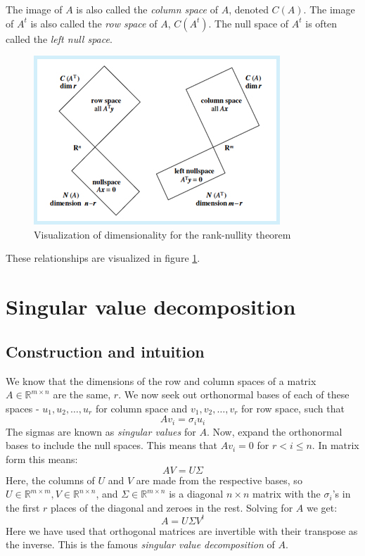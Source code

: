 \documentclass[12pt, a4paper]{article}
\numberwithin{equation}{section}
\begin{document}
The image of $A$ is also called the \textit{column space} of $A$, denoted $C(A)$. The image of $A^t$ is also called the \textit{row space} of $A$, $C(A^t)$. The null space of $A^t$ is often called the \textit{left null space}.

\begin{figure}
\centering
\includegraphics[width=\textwidth]{row_column_null}
\caption{Visualization of dimensionality for the rank-nullity theorem}
\label{fig:rank-nullity}
\end{figure}

These relationships are visualized in figure \ref{fig:rank-nullity}.

\section{Singular value decomposition}

\subsection{Construction and intuition}
We know that the dimensions of the row and column spaces of a matrix $A\in\mathbb{R}^{m\times n}$ are the same, $r$. We now seek out orthonormal bases of each of these spaces - $u_1,u_2,\ldots,u_r$ for column space and $v_1,v_2,\ldots,v_r$ for row space, such that
\begin{equation}
Av_i=\sigma_i u_i
\end{equation}
The sigmas are known as \textit{singular values} for $A$. Now, expand the orthonormal bases to include the null spaces. This means that $Av_i=0$ for $r<i\le n$. In matrix form this means:
\begin{equation}
AV=U\Sigma
\end{equation}
Here, the columns of $U$ and $V$ are made from the respective bases, so $U\in\mathbb{R}^{m\times m}, V\in\mathbb{R}^{n\times n}$, and $\Sigma\in\mathbb{R}^{m\times n}$ is a diagonal $n\times n$ matrix with the $\sigma_i$'s in the first $r$ places of the diagonal and zeroes in the rest. Solving for $A$ we get:
\begin{equation}
A=U\Sigma V^t
\end{equation}
Here we have used that orthogonal matrices are invertible with their transpose as the inverse. This is the famous \textit{singular value decomposition} of $A$.
\end{document}
